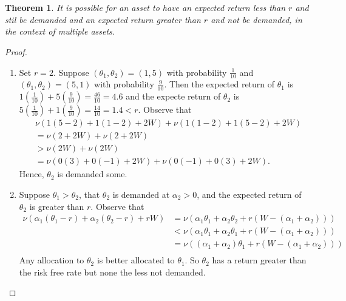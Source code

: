\documentclass[12pt]{article}
\newtheorem{thm}{Theorem}[section]
\theoremstyle{definition}
\theoremstyle{remark}
\begin{document}
\section{}
\begin{thm}
  It is possible for an asset to have an expected return less than $r$ and stil be demanded and an expected return greater than $r$ and not be demanded, in the context of multiple assets.
\end{thm}
\begin{proof}
  \begin{enumerate}
    \item Set $r = 2$. Suppose $(\theta_1, \theta_2) = (1, 5)$ with probability $\frac{1}{10}$ and $(\theta_1, \theta_2) = (5, 1)$ with probability $\frac{9}{10}$.
    Then the expected return of $\theta_1$ is $1 \left( \frac{1}{10}\right) + 5 \left( \frac{9}{10}\right) = \frac{46}{10} = 4.6$
    and the expecte return of $\theta_2$ is $5 \left( \frac{1}{10}\right) + 1 \left( \frac{9}{10}\right) = \frac{14}{10} = 1.4 < r$. Observe that
    \begin{align*}
      & \nu(1(5-2) + 1(1-2) + 2W) + \nu(1(1-2) + 1(5-2) + 2W) \\
      &= \nu(2 + 2W) + \nu(2 + 2W) \\
      &> \nu(2W) + \nu(2W) \\
      &= \nu(0(3) + 0(-1) + 2W) + \nu(0(-1) + 0(3) + 2W).
    \end{align*}
    Hence, $\theta_2$ is demanded some.
    \item Suppose $\theta_1 > \theta_2$, that $\theta_2$ is demanded at $\alpha_2 > 0$, and the expected return of $\theta_2$ is greater than $r$. Observe that
    \begin{align*}
      \nu(\alpha_1 (\theta_1 - r) + \alpha_2 (\theta_2 - r) + rW) &= \nu(\alpha_1 \theta_1 + \alpha_2 \theta_2 + r(W - (\alpha_1 + \alpha_2))) \\
      &< \nu(\alpha_1 \theta_1 + \alpha_2 \theta_1 + r(W - (\alpha_1 + \alpha_2))) \\
      &= \nu((\alpha_1 + \alpha_2) \theta_1 + r(W - (\alpha_1 + \alpha_2))) \\
    \end{align*}
    Any allocation to $\theta_2$ is better allocated to $\theta_1$. So $\theta_2$ has a return greater than the risk free rate but none the less not demanded.
  \end{enumerate}
\end{proof}
%
%
\end{document}
